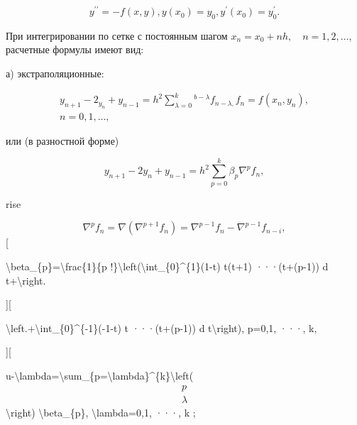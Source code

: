 \documentclass[10pt]{article}
\begin{document}
\[

y^{\prime \prime}=-f(x, y), y\left(x_{0}\right)=y_{0}, y^{\prime}\left(x_{0}\right)=y_{0}^{\prime} .

\]



При интегрировании по сетке с постоянным шагом $x_{n}=x_{0}+n h, \quad n=1,2, \ldots$, расчетные формулы имеют вид:



а) экстраполяционные:



\[

\begin{gathered}

y_{n+1}-2_{y_{n}}+y_{n-1}=h^{2} \sum_{\lambda=0}^{k}{ }^{b-\lambda} f_{n-\lambda,} f_{n}=f\left(x_{n}, y_{n}\right), \\

n=0,1, \ldots,

\end{gathered}

\]



или (в разностной форме)



\[

y_{n+1}-2 y_{n}+y_{n-1}=h^{2} \sum_{p=0}^{k} \beta_{p} \nabla^{p} f_{n},

\]



rise



\[

\nabla^{p} f_{n}=\nabla\left(\nabla^{p+1} f_{n}\right)=\nabla^{p-1} f_{n}-\nabla^{p-1} f_{n-i},

\][



\textbackslash beta\_\{p\}=\textbackslash frac\{1\}\{p !\}\textbackslash left(\textbackslash int\_\{0\}\^{}\{1\}(1-t) t(t+1) ···(t+(p-1)) d t+\textbackslash right.



][



\textbackslash left.+\textbackslash int\_\{0\}\^{}\{-1\}(-1-t) t ···(t+(p-1)) d t\textbackslash right), p=0,1, ···, k,



][



u-\textbackslash lambda=\textbackslash sum\_\{p=\textbackslash lambda\}\^{}\{k\}\textbackslash left(\[

\begin{array}{l}

p \\

\lambda

\end{array}

\]\textbackslash right) \textbackslash beta\_\{p\}, \textbackslash lambda=0,1, ···, k ;
\end{document}
